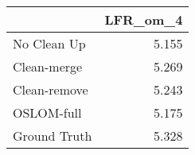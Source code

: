 \begin{tabular}{lr}
\toprule
{} & LFR_om_4 \\
\midrule
No Clean Up  &    5.155 \\
Clean-merge  &    5.269 \\
Clean-remove &    5.243 \\
OSLOM-full   &    5.175 \\
Ground Truth &    5.328 \\
\bottomrule
\end{tabular}
